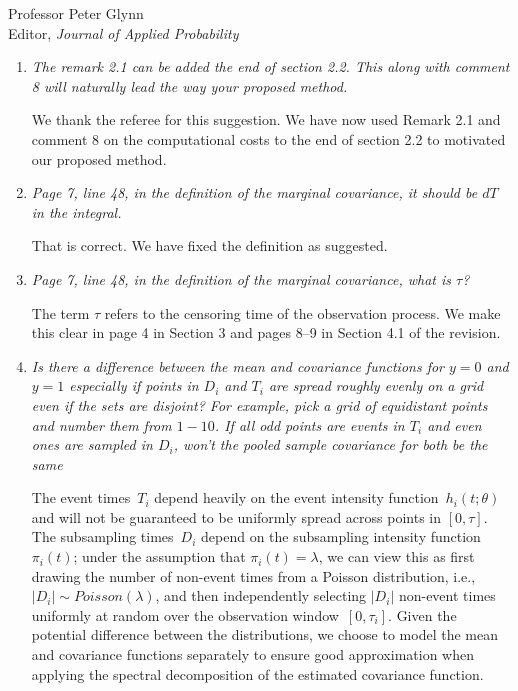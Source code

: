 \documentclass[11pt]{letter} %
\begin{document}
\begin{letter}{Professor
	Peter Glynn\\
	Editor, {\em Journal of Applied Probability}}
\begin{enumerate}
\item{\it The remark 2.1 can be added the end of section 2.2. This along with
comment 8 will naturally lead the way your proposed method.}

\vspace{5mm}
We thank the referee for this suggestion.  We have now used Remark 2.1 and comment 8 on the computational costs to the end of section 2.2 to motivated our proposed method.
\vspace{5mm}

\item {\it Page 7, line 48, in the definition of the marginal covariance, it should be $dT$ in the integral.}

\vspace{5mm}
That is correct.  We have fixed the definition as suggested.
\vspace{5mm}

\item {\it Page 7, line 48, in the definition of the marginal covariance, what is $\tau$?}

\vspace{5mm}
The term $\tau$ refers to the censoring time of the observation process. We make this clear in page 4 in Section 3 and pages 8--9 in Section 4.1 of the revision.
\vspace{5mm}


\item {\it Is there a difference between the mean and covariance functions for $y = 0$ and $y = 1$ especially if points in $D_i$ and $T_i$ are spread roughly evenly on a grid even if the sets are disjoint? For example, pick a grid of equidistant points and number them from $1-10$. If all odd points are events in $T_i$ and even ones are sampled in $D_i$, won't the pooled sample covariance for both be the same}

\vspace{5mm}
The event times~$T_i$ depend heavily on the event intensity function~$h_i (t;\theta)$ and will not be guaranteed to be uniformly spread across points in $[0,\tau]$.  The subsampling times~$D_i$ depend on the subsampling intensity function~$\pi_i(t)$; under the assumption that $\pi_i (t) = \lambda$, we can view this as first drawing the number of non-event times from a Poisson distribution, i.e., $| D_i | \sim Poisson(\lambda)$, and then independently selecting $|D_i|$ non-event times uniformly at random over the observation window~$[0, \tau_i]$.  Given the potential difference between the distributions, we choose to model the mean and covariance functions separately to ensure good approximation when applying the spectral decomposition of the estimated covariance function.
\vspace{5mm}


\end{enumerate}
\end{letter}
\end{document}
